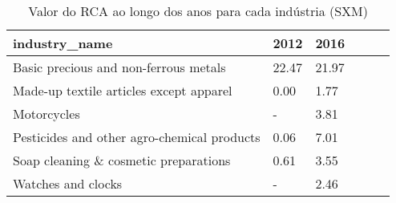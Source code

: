 \begin{table}
\centering
\caption{Valor do RCA ao longo dos anos para cada indústria (SXM)}
\begin{tabular}{p{6cm}p{1.5cm}p{1.5cm}p{1.5cm}p{1.5cm}p{1.5cm}}
\toprule
                              industry\_name &  2012 &  2016 \\
\midrule
      Basic precious and non-ferrous metals & 22.47 & 21.97 \\
    Made-up textile articles except apparel &  0.00 &  1.77 \\
                                Motorcycles &     - &  3.81 \\
Pesticides and other agro-chemical products &  0.06 &  7.01 \\
      Soap cleaning \& cosmetic preparations &  0.61 &  3.55 \\
                         Watches and clocks &     - &  2.46 \\
\bottomrule
\end{tabular}
\end{table}
